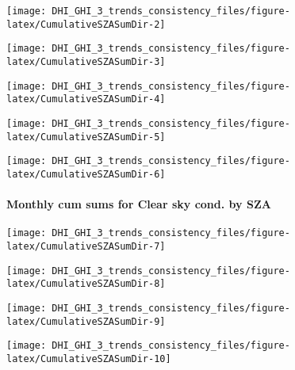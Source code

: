 \documentclass[
  10pt,
  a4paper,oneside]{article}
\begin{document}
\begin{center}\texttt{[image: DHI\_GHI\_3\_trends\_consistency\_files/figure-latex/CumulativeSZASumDir-2]} \end{center}

\begin{center}\texttt{[image: DHI\_GHI\_3\_trends\_consistency\_files/figure-latex/CumulativeSZASumDir-3]} \end{center}

\begin{center}\texttt{[image: DHI\_GHI\_3\_trends\_consistency\_files/figure-latex/CumulativeSZASumDir-4]} \end{center}

\begin{center}\texttt{[image: DHI\_GHI\_3\_trends\_consistency\_files/figure-latex/CumulativeSZASumDir-5]} \end{center}

\begin{center}\texttt{[image: DHI\_GHI\_3\_trends\_consistency\_files/figure-latex/CumulativeSZASumDir-6]} \end{center}

\newpage

\FloatBarrier

\hypertarget{monthly-cum-sums-for-clear-sky-cond.-by-sza-1}{%
\paragraph{Monthly cum sums for Clear sky cond. by SZA}\label{monthly-cum-sums-for-clear-sky-cond.-by-sza-1}}

\begin{center}\texttt{[image: DHI\_GHI\_3\_trends\_consistency\_files/figure-latex/CumulativeSZASumDir-7]} \end{center}

\begin{center}\texttt{[image: DHI\_GHI\_3\_trends\_consistency\_files/figure-latex/CumulativeSZASumDir-8]} \end{center}

\begin{center}\texttt{[image: DHI\_GHI\_3\_trends\_consistency\_files/figure-latex/CumulativeSZASumDir-9]} \end{center}

\begin{center}\texttt{[image: DHI\_GHI\_3\_trends\_consistency\_files/figure-latex/CumulativeSZASumDir-10]} \end{center}
\end{document}
